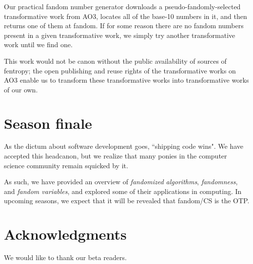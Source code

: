 \documentclass[9pt]{sigplanconf}
\begin{document}
Our practical fandom number generator downloads a
pseudo-fandomly-selected transformative work from AO3, locates all of
the base-10 numbers in it, and then returns one of them at fandom. If
for some reason there are no fandom numbers present in a given
transformative work, we simply try another transformative work until
we find one.

This work would not be canon without the public availability of
sources of fentropy; the open publishing and reuse rights of the
transformative works on AO3 enable us to transform these
transformative works into transformative works of our own.

\section{Season finale}
As the dictum about software development goes, ``shipping code
wins". We have accepted this headcanon, but we realize that many
ponies in the computer science community remain squicked by it.

As such, we have provided an overview of \emph{fandomized algorithms},
\emph{fandomness}, and \emph{fandom variables}, and explored some of
their applications in computing. In upcoming seasons, we expect that
it will be revealed that fandom/CS is the OTP.

\section*{Acknowledgments}
We would like to thank our beta readers.



\end{document}
